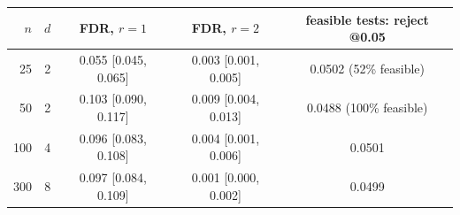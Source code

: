 \begin{tabular}{rcccc}
\toprule
$n$ & $d$ & FDR, $r{=}1$ & FDR, $r{=}2$ & feasible tests: reject @0.05 \\
\midrule
25 & 2 & 0.055 [0.045, 0.065] & 0.003 [0.001, 0.005] & 0.0502 (52\% feasible) \\
50 & 2 & 0.103 [0.090, 0.117] & 0.009 [0.004, 0.013] & 0.0488 (100\% feasible) \\
100 & 4 & 0.096 [0.083, 0.108] & 0.004 [0.001, 0.006] & 0.0501 \\
300 & 8 & 0.097 [0.084, 0.109] & 0.001 [0.000, 0.002] & 0.0499 \\
\bottomrule
\end{tabular}
